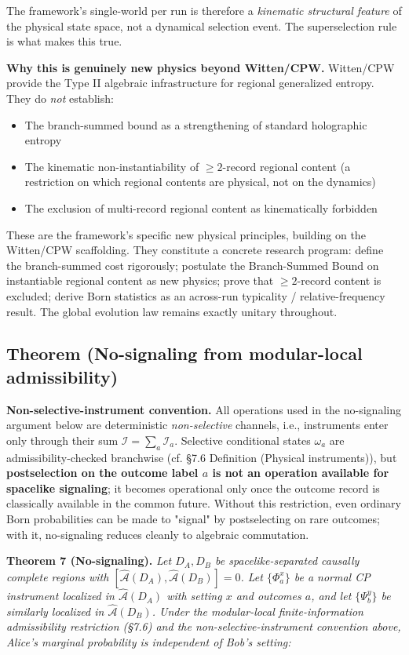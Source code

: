 \documentclass[11pt,a4paper]{article}
\begin{document}
The framework's single-world per run is therefore a \emph{kinematic structural feature} of the physical state space, not a dynamical selection event. The superselection rule is what makes this true.

\textbf{Why this is genuinely new physics beyond Witten/CPW.} Witten/CPW provide the Type II algebraic infrastructure for regional generalized entropy. They do \emph{not} establish:
\begin{itemize}
  \item The branch-summed bound as a strengthening of standard holographic entropy
  \item The kinematic non-instantiability of $\ge 2$-record regional content (a restriction on which regional contents are physical, not on the dynamics)
  \item The exclusion of multi-record regional content as kinematically forbidden
\end{itemize}

These are the framework's specific new physical principles, building on the Witten/CPW scaffolding. They constitute a concrete research program: define the branch-summed cost rigorously; postulate the Branch-Summed Bound on instantiable regional content as new physics; prove that $\ge 2$-record content is excluded; derive Born statistics as an across-run typicality / relative-frequency result. The global evolution law remains exactly unitary throughout.

\subsection{Theorem (No-signaling from modular-local admissibility)}

\textbf{Non-selective-instrument convention.} All operations used in the no-signaling argument below are deterministic \emph{non-selective} channels, i.e., instruments enter only through their sum $\mathcal{I} = \sum_a \mathcal{I}_a$. Selective conditional states $\omega_a$ are admissibility-checked branchwise (cf. §7.6 Definition (Physical instruments)), but \textbf{postselection on the outcome label $a$ is not an operation available for spacelike signaling}; it becomes operational only once the outcome record is classically available in the common future. Without this restriction, even ordinary Born probabilities can be made to "signal" by postselecting on rare outcomes; with it, no-signaling reduces cleanly to algebraic commutation.

\textbf{Theorem 7 (No-signaling).} \emph{Let $D_A, D_B$ be spacelike-separated causally complete regions with $[\hat{\mathcal{A}}(D_A), \hat{\mathcal{A}}(D_B)] = 0$. Let $\{\Phi_a^x\}$ be a normal CP instrument localized in $\hat{\mathcal{A}}(D_A)$ with setting $x$ and outcomes $a$, and let $\{\Psi_b^y\}$ be similarly localized in $\hat{\mathcal{A}}(D_B)$. Under the modular-local finite-information admissibility restriction (§7.6) and the non-selective-instrument convention above, Alice's marginal probability is independent of Bob's setting:}
\end{document}
